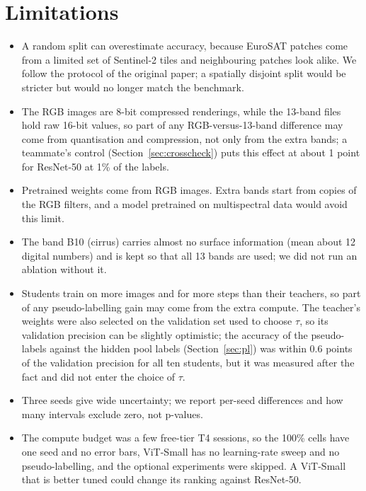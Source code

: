 \documentclass[conference]{IEEEtran}
\begin{document}
\section{Limitations}\label{sec:limits}
\begin{itemize}
\item A random split can overestimate accuracy, because EuroSAT patches come from a limited set of Sentinel-2 tiles and neighbouring patches look alike. We follow the protocol of the original paper; a spatially disjoint split would be stricter but would no longer match the benchmark.
\item The RGB images are 8-bit compressed renderings, while the 13-band files hold raw 16-bit values, so part of any RGB-versus-13-band difference may come from quantisation and compression, not only from the extra bands; a teammate's control (Section~\ref{sec:crosscheck}) puts this effect at about 1 point for ResNet-50 at 1\% of the labels.
\item Pretrained weights come from RGB images. Extra bands start from copies of the RGB filters, and a model pretrained on multispectral data would avoid this limit.
\item The band B10 (cirrus) carries almost no surface information (mean about 12 digital numbers) and is kept so that all 13 bands are used; we did not run an ablation without it.
\item Students train on more images and for more steps than their teachers, so part of any pseudo-labelling gain may come from the extra compute. The teacher's weights were also selected on the validation set used to choose $\tau$, so its validation precision can be slightly optimistic; the accuracy of the pseudo-labels against the hidden pool labels (Section~\ref{sec:pl}) was within 0.6 points of the validation precision for all ten students, but it was measured after the fact and did not enter the choice of $\tau$.
\item Three seeds give wide uncertainty; we report per-seed differences and how many intervals exclude zero, not p-values.
\item The compute budget was a few free-tier T4 sessions, so the 100\% cells have one seed and no error bars, ViT-Small has no learning-rate sweep and no pseudo-labelling, and the optional experiments were skipped. A ViT-Small that is better tuned could change its ranking against ResNet-50.
\end{itemize}
\end{document}
